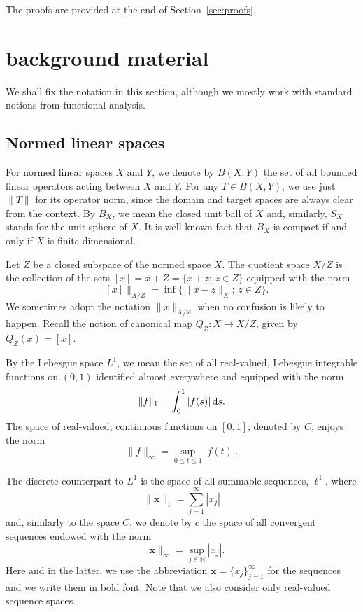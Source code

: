 \documentclass[10pt,reqno]{amsart}
\def\N{\mathbb{N}}
\def\d{{\fam0 d}}
\numberwithin{equation}{section}
\def\li{{\ell^1}}
\def\vx{\mathbf{x}}
\begin{document}
The proofs are provided at the end of Section~\ref{sec:proofs}.

\section{background material} \label{sec:back}

We shall fix the notation in this section, although we mostly work with standard notions from functional analysis.


\subsection{Normed linear spaces}


For normed linear spaces $X$ and $Y$, we denote by $B(X,Y)$ the set of
all bounded linear operators acting between $X$ and $Y$. For any $T\in B(X,Y)$,
we use just $\|T\|$ for its operator norm, since the domain and target spaces
are always clear from the context.
By $B_X$, we mean the closed unit ball of $X$ and,
similarly, $S_X$ stands for the unit sphere of $X$. It is well-known fact that $B_X$ is compact if and only if $X$ is finite-dimensional.

Let $Z$ be a closed subspace of the normed space $X$. The quotient space $X/Z$ is the
collection of the sets $[x] = x+Z = \{x+z;\,z\in Z\}$ equipped with the norm
\begin{equation*}
	\| [x] \|_{X/Z} = \inf\{ \|x-z\|_X;\,z\in Z\}.
\end{equation*}
We sometimes adopt the notation $\|x\|_{X/Z}$ when no confusion is likely to happen.
Recall the notion of canonical map $Q_Z\colon X\to X/Z$, given by $Q_Z(x)=[x]$.


By the Lebesgue space $L^1$, we mean the set of all real-valued, Lebesgue integrable
functions on $(0,1)$ identified almost everywhere and equipped with
the norm
\begin{equation*}
	\|f\|_1 = \int_{0}^{1} |f(s)|\,\d s.
\end{equation*}
The space of real-valued, continuous functions on $[0,1]$, denoted by $C$, enjoys the norm
\begin{equation*}
	\|f\|_\infty = \sup_{0\le t\le 1} |f(t)|.
\end{equation*}

The discrete counterpart to $L^1$ is
the space of all summable sequences, $\li$, where
\begin{equation*}
	\|\vx\|_1 = \sum_{j=1}^\infty |x_j|
\end{equation*}
and, similarly to the space $C$, we denote by $c$ the space of all convergent sequences
endowed with the norm
\begin{equation*}
	\|\vx\|_\infty = \sup_{j\in\N} |x_j|.
\end{equation*}
Here and in the latter, we use the abbreviation $\vx =
\{x_j\}_{j=1}^\infty$ for the sequences and we write them in bold font.
Note that we also consider only real-valued sequence spaces.
\end{document}
